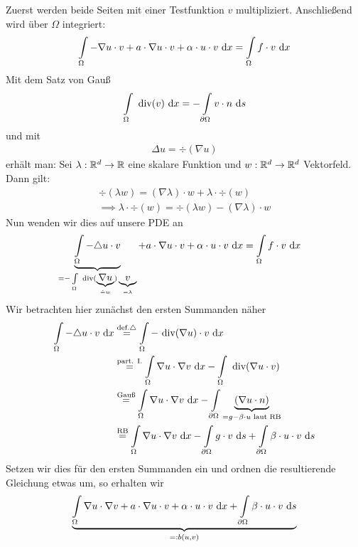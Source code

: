 \documentclass[12pt,a4paper]{article}
\begin{document}
\begin{lösung}
Zuerst werden beide Seiten mit einer Testfunktion $v$ multipliziert. Anschließend wird über $\Omega$ integriert:
\begin{align*}
\int\limits_\Omega -\nabla u\cdot v+a\cdot\nabla u\cdot v+\alpha\cdot u\cdot v\text{ d} x=\int\limits_\Omega f\cdot v\text{ d} x
\end{align*}
 Mit dem Satz von Gauß 
 \begin{align*}
 \int\limits_\Omega\text{ div}(v)\text{ d} x=-\int\limits_{\partial\Omega} v\cdot n\text{ d} s
 \end{align*}
 und mit
 \begin{align*}
 \Delta u=\div(\nabla u)
 \end{align*}
 erhält man:
 Sei $\lambda:\mathbb{R}^d\to\mathbb{R}$ eine skalare Funktion und $w:\mathbb{R}^d\to\mathbb{R}^d$ Vektorfeld. Dann gilt:
 \begin{align*}
 \div(\lambda w)=(\nabla\lambda)\cdot w+\lambda\cdot\div(w)\\
 \implies
 \lambda\cdot\div(w)=\div(\lambda w)-(\nabla\lambda)\cdot w
 \end{align*}
 Nun wenden wir dies auf unsere PDE an
 \begin{align*}
 \underbrace{\int\limits_\Omega -\triangle u\cdot v}_{=-\int\limits_\Omega\text{ div}(\underbrace{\nabla u}_{\hat{=}w})\underbrace{v}_{=\lambda}}+a\cdot\nabla u\cdot v+\alpha\cdot u\cdot v\text{ d} x
 &=\int\limits_\Omega f\cdot v \text{ d} x
 \end{align*}
 Wir betrachten hier zunächst den ersten Summanden näher
 \begin{align*}
 \int\limits_\Omega -\triangle u\cdot v\text{ d} x
 &\stackrel{\text{def.} \triangle}{=}\int\limits_\Omega - \text{ div}(\nabla u) \cdot v \text{ d} x \\
 &\stackrel{\text{part. I.}}{=}\int\limits_\Omega\nabla u\cdot\nabla v\text{ d} x-\int\limits_{\Omega}\text{ div}(\nabla u \cdot v)\\
 &\stackrel{\text{Gauß}}{=}\int\limits_\Omega\nabla u\cdot\nabla v\text{ d} x-\int\limits_{\partial\Omega}\underbrace{(\nabla u\cdot n)}_{=g-\beta\cdot u\text{ laut RB}}\\
 &\stackrel{\text{RB}}{=}\int\limits_\Omega\nabla u\cdot\nabla v\text{ d} x-\int\limits_{\partial\Omega} g\cdot v\text{ d} s+\int\limits_{\partial\Omega}\beta\cdot u\cdot v\text{ d} s
 \end{align*}
 Setzen wir dies für den ersten Summanden ein und ordnen die resultierende Gleichung etwas um, so erhalten wir
 \begin{align*}
\underbrace{\int\limits_\Omega\nabla u\cdot\nabla v+a\cdot\nabla u\cdot v+\alpha\cdot u\cdot v\d x+\int\limits_{\partial\Omega}\beta\cdot u\cdot v\d s}_{=:b(u,v)}

\end{align*}
\end{lösung}
\end{document}
